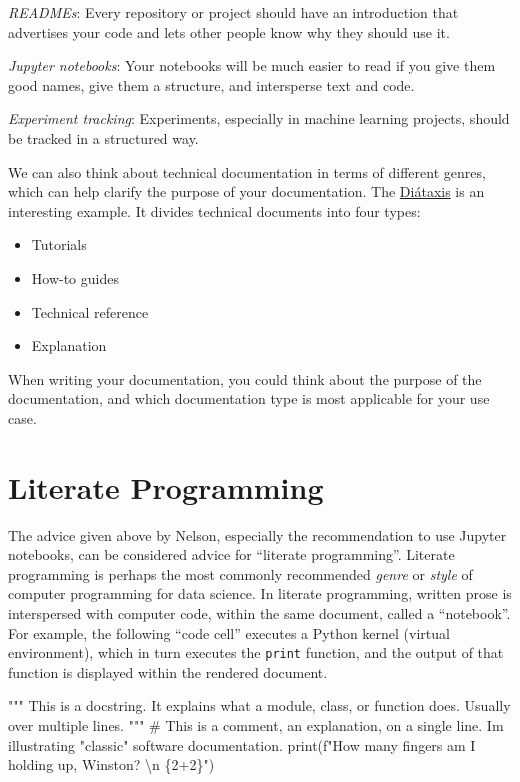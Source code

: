 \documentclass[
  letterpaper,
  DIV=11,
  numbers=noendperiod]{scrartcl}
\newenvironment{Shaded}{\begin{snugshade}}{\end{snugshade}}
\newcommand{\BuiltInTok}[1]{\textcolor[rgb]{0.00,0.23,0.31}{#1}}
\newcommand{\CharTok}[1]{\textcolor[rgb]{0.13,0.47,0.30}{#1}}
\newcommand{\CommentTok}[1]{\textcolor[rgb]{0.37,0.37,0.37}{#1}}
\newcommand{\DecValTok}[1]{\textcolor[rgb]{0.68,0.00,0.00}{#1}}
\newcommand{\NormalTok}[1]{\textcolor[rgb]{0.00,0.23,0.31}{#1}}
\newcommand{\OperatorTok}[1]{\textcolor[rgb]{0.37,0.37,0.37}{#1}}
\newcommand{\SpecialCharTok}[1]{\textcolor[rgb]{0.37,0.37,0.37}{#1}}
\newcommand{\SpecialStringTok}[1]{\textcolor[rgb]{0.13,0.47,0.30}{#1}}
\begin{document}
\emph{READMEs}: Every repository or project should have an introduction
that advertises your code and lets other people know why they should use
it.

\emph{Jupyter notebooks}: Your notebooks will be much easier to read if
you give them good names, give them a structure, and intersperse text
and code.

\emph{Experiment tracking}: Experiments, especially in machine learning
projects, should be tracked in a structured way.

We can also think about technical documentation in terms of different
genres, which can help clarify the purpose of your documentation. The
\href{https://diataxis.fr/}{Diátaxis} is an interesting example. It
divides technical documents into four types:

\begin{itemize}
\item
  Tutorials
\item
  How-to guides
\item
  Technical reference
\item
  Explanation
\end{itemize}

When writing your documentation, you could think about the purpose of
the documentation, and which documentation type is most applicable for
your use case.

\section{Literate Programming}\label{literate-programming}

The advice given above by Nelson, especially the recommendation to use
Jupyter notebooks, can be considered advice for ``literate
programming''. Literate programming is perhaps the most commonly
recommended \emph{genre} or \emph{style} of computer programming for
data science. In literate programming, written prose is interspersed
with computer code, within the same document, called a ``notebook''. For
example, the following ``code cell'' executes a Python kernel (virtual
environment), which in turn executes the \texttt{print} function, and
the output of that function is displayed within the rendered document.

\begin{Shaded}
\begin{Highlighting}[]
\CommentTok{"""}
\CommentTok{This is a docstring. }
\CommentTok{It explains what a module, class, or function does.}
\CommentTok{Usually over multiple lines.}
\CommentTok{"""}
\CommentTok{\# This is a comment, an explanation, on a single line. I\textquotesingle{}m illustrating "classic" software documentation.}
\BuiltInTok{print}\NormalTok{(}\SpecialStringTok{f"How many fingers am I holding up, Winston? }\CharTok{\textbackslash{}n}\SpecialStringTok{ }\SpecialCharTok{\{}\DecValTok{2}\OperatorTok{+}\DecValTok{2}\SpecialCharTok{\}}\SpecialStringTok{"}\NormalTok{)}
\end{Highlighting}
\end{Shaded}
\end{document}
